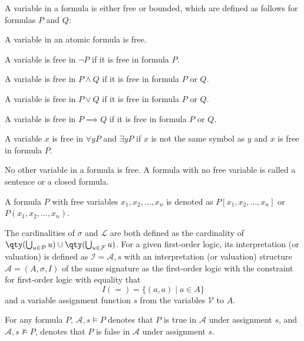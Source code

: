 \documentclass[a4paper,12pt]{article}
\begin{document}
A variable in a formula is either free or bounded, which are defined as follows for formulas $P$ and $Q$:
\bit
\item A variable in an atomic formula is free.
\item A variable is free in $\neg P$ if it is free in formula $P$.
\item A variable is free in $P\land Q$ if it is free in formula $P$ or $Q$.
\item A variable is free in $P\lor Q$ if it is free in formula $P$ or $Q$.
\item A variable is free in $P\implies Q$ if it is free in formula $P$ or $Q$.
\item A variable $x$ is free in $\forall yP$ and $\exists yP$ if $x$ is not the same symbol as $y$ and $x$ is free in formula $P$.
\item No other variable in a formula is free.
\eit
A formula with no free variable is called a sentence or a closed formula.

A formula $P$ with free variables $x_1,x_2,\ldots,x_n$ is denoted as $P[x_1,x_2,\ldots,x_n]$ or $P(x_1,x_2,\ldots,x_n)$.

The cardinalities of $\sigma$ and $\mathcal{L}$ are both defined as the cardinality of $\qty(\bigcup_{u\in\mathcal{P}}u)\cup\qty(\bigcup_{u\in\mathcal{F}}u)$.
For a given first-order logic, its interpretation (or valuation) is defined as $\mathcal{I}=\mathcal{A},s$ with an interpretation (or valuation) structure $\mathcal{A}=(A,\sigma,I)$ of the same signature as the first-order logic with the constraint for first-order logic with equality that
\[I(=)=\{(a,a)\mid a\in A\}\]
and a variable assignment function $s$ from the variables $\mathcal{V}$ to $A$.

For any formula $P$, $\mathcal{A},s\vDash P$ denotes that $P$ is true in $\mathcal{A}$ under assignment $s$, and $\mathcal{A},s\nvDash P$, denotes that $P$ is false in $\mathcal{A}$ under assignment $s$.
\end{document}
